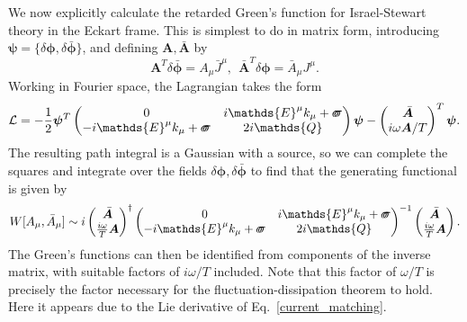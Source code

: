 \documentclass[aps,prd,nofootinbib,amsmath,amssymb,showpacs,longbibliography,singlecolumn,superscriptaddress,notitlepage]{revtex4-1}
\theoremstyle{plain}
\theoremstyle{definition}
\newcommand*{\Scale}[2][4]{\scalebox{#1}{$#2$}}%
\newcommand{\forceds}[1]{\Scale[1.1]{\ensuremath{\mathrlap{{{#1}}}\hspace{1.4pt}#1}}}
\newcommand{\cvec}[1]{\ensuremath{\bm {#1}}}
\newcommand{\cmat}[1]{\ensuremath{\mathds{{#1}}}}
\newcommand{\cmatgreek}[1]{\ensuremath{\forceds{{#1}}}}
\begin{document}
We now explicitly calculate the retarded Green's function for Israel-Stewart theory in the Eckart frame. This is simplest to do in matrix form, introducing $\cvec{\psi} = \{ \delta \cvec{\phi} , \delta \bar{\cvec{\phi}} \}$, and defining $\cvec{A}, \bar{\cvec{A}}$ by
\begin{equation}
    \cvec{A}^T \delta \bar{\cvec{\phi}} = A_{\mu} \bar{J}^{\mu} , \:\: \bar{\cvec{A}}^T \delta \cvec{\phi} = \bar{A}_{\mu} J^{\mu} .
\end{equation}
Working in Fourier space, the Lagrangian takes the form 
\begin{equation}
    \mathcal{L} = -\frac{1}{2} \cvec{\psi}^T \begin{pmatrix}
        0 & i\cmat{E}^{\mu} k_{\mu} + \cmatgreek{\sigma} \\
        -i \cmat{E}^{\mu} k_{\mu} + \cmatgreek{\sigma} & 2i \cmat{Q}
    \end{pmatrix} \cvec{\psi} - \begin{pmatrix}
        \bar{\cvec{A}} \\
        i\omega \cvec{A} / T
    \end{pmatrix}^T \cvec{\psi} .
\end{equation}
The resulting path integral is a Gaussian with a source, so we can complete the squares and integrate over the fields $\delta \cvec{\phi}, \delta \bar{\cvec{\phi}}$ to find that the generating functional is given by 
\begin{equation}
    W[A_{\mu}, \bar{A}_{\mu}] \sim i \begin{pmatrix}
        \bar{\cvec{A}} \\
        \frac{i\omega}{T} \cvec{A}
    \end{pmatrix}^{\dagger} \begin{pmatrix}
        0 & i\cmat{E}^{\mu} k_{\mu} + \cmatgreek{\sigma} \\
        -i \cmat{E}^{\mu} k_{\mu} + \cmatgreek{\sigma} & 2i \cmat{Q}
    \end{pmatrix}^{-1} \begin{pmatrix}
        \bar{\cvec{A}} \\
        \frac{i\omega}{T} \cvec{A}
    \end{pmatrix} .
\end{equation}
The Green's functions can then be identified from components of the inverse matrix, with suitable factors of $i\omega / T$ included. Note that this factor of $\omega / T$ is precisely the factor necessary for the fluctuation-dissipation theorem to hold. Here it appears due to the Lie derivative of Eq.\ \eqref{current_matching}.
\end{document}
